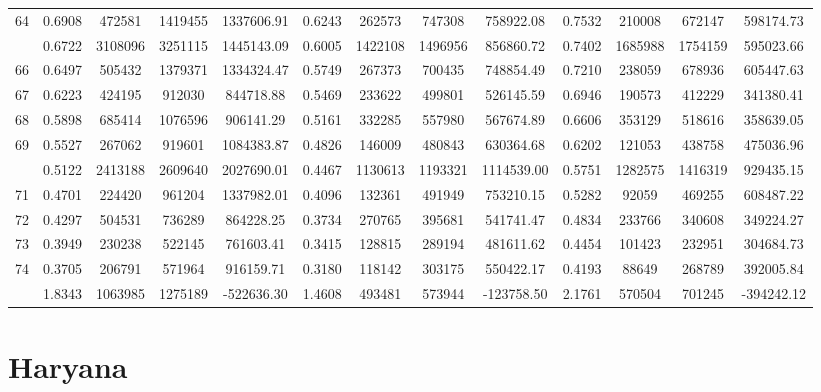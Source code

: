 \documentclass[
  12pt,
]{article}
\begin{document}
\begin{longtable}[t]{lcccccccccccc}
64 & 0.6908 & 472581 & 1419455 & 1337606.91 & 0.6243 & 262573 & 747308 & 758922.08 & 0.7532 & 210008 & 672147 & 598174.73\\
\addlinespace
65 & 0.6722 & 3108096 & 3251115 & 1445143.09 & 0.6005 & 1422108 & 1496956 & 856860.72 & 0.7402 & 1685988 & 1754159 & 595023.66\\
66 & 0.6497 & 505432 & 1379371 & 1334324.47 & 0.5749 & 267373 & 700435 & 748854.49 & 0.7210 & 238059 & 678936 & 605447.63\\
67 & 0.6223 & 424195 & 912030 & 844718.88 & 0.5469 & 233622 & 499801 & 526145.59 & 0.6946 & 190573 & 412229 & 341380.41\\
68 & 0.5898 & 685414 & 1076596 & 906141.29 & 0.5161 & 332285 & 557980 & 567674.89 & 0.6606 & 353129 & 518616 & 358639.05\\
69 & 0.5527 & 267062 & 919601 & 1084383.87 & 0.4826 & 146009 & 480843 & 630364.68 & 0.6202 & 121053 & 438758 & 475036.96\\
\addlinespace
70 & 0.5122 & 2413188 & 2609640 & 2027690.01 & 0.4467 & 1130613 & 1193321 & 1114539.00 & 0.5751 & 1282575 & 1416319 & 929435.15\\
71 & 0.4701 & 224420 & 961204 & 1337982.01 & 0.4096 & 132361 & 491949 & 753210.15 & 0.5282 & 92059 & 469255 & 608487.22\\
72 & 0.4297 & 504531 & 736289 & 864228.25 & 0.3734 & 270765 & 395681 & 541741.47 & 0.4834 & 233766 & 340608 & 349224.27\\
73 & 0.3949 & 230238 & 522145 & 761603.41 & 0.3415 & 128815 & 289194 & 481611.62 & 0.4454 & 101423 & 232951 & 304684.73\\
74 & 0.3705 & 206791 & 571964 & 916159.71 & 0.3180 & 118142 & 303175 & 550422.17 & 0.4193 & 88649 & 268789 & 392005.84\\
\addlinespace
75 & 1.8343 & 1063985 & 1275189 & -522636.30 & 1.4608 & 493481 & 573944 & -123758.50 & 2.1761 & 570504 & 701245 & -394242.12\\*
\end{longtable}
\endgroup{}

\pagebreak

\hypertarget{haryana}{%
\section{Haryana}\label{haryana}}

\begingroup\fontsize{9.7}{11.7}\selectfont
\end{document}
